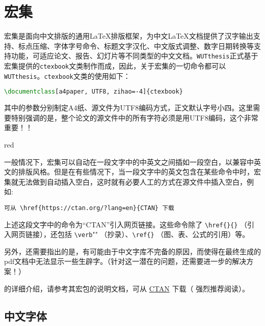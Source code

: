 \section{{\CTeX}宏集}


\par {\CTeX}宏集是面向中文排版的通用{\LaTeX}排版框架，为中文{\LaTeX}文档提供了汉字输出支持、标点压缩、字体字号命令、标题文字汉化、中文版式调整、数字日期转换等支持功能，可适应论文、报告、幻灯片等不同类型的中文文档。\texttt{WUTthesis}正式基于{\CTeX}宏集提供的\texttt{ctexbook}文类制作而成，因此，关于{\CTeX}宏集的一切命令都可以\texttt{WUTthesis}。\texttt{ctexbook}文类的使用如下：
\begin{lstlisting}[language=TeX]
\documentclass[a4paper, UTF8, zihao=-4]{ctexbook}
\end{lstlisting}
其中的参数分别制定A4纸、源文件为UTF8编码方式，正文默认字号小四。{\color{red}这里需要特别强调的是，整个论文的源文件中的所有字符必须是用UTF8编码，这个非常重要！！}


\begin{color}{red}
\par 一般情况下，{\CTeX}宏集可以自动在一段文字中的中英文之间插如一段空白，以兼容中英文的排版风格。但是在有些情况下，当一段文字中的英文包含在某些命令中时，{\CTeX}宏集就无法做到自动插入空白，这时就有必要人工的方式在源文件中插入空白，例如:
\begin{lstlisting}
可从 \href{https://ctan.org/?lang=en}{CTAN} 下载
\end{lstlisting}
上述这段文字中的命令为“CTAN”引入网页链接。这些命令除了 \verb"\href{}{}" （引入网页链接），还包括 \verb"\verb""" （抄录）、\verb"\ref{}" （图、表、公式的引用）等。
\end{color}

{\color{red}\par 另外，还需要指出的是，有可能由于中文字库不完备的原因，而使得在最终生成的pdf文档中无法显示一些生辟字。（针对这一潜在的问题，还需要进一步的解决方案！）}


\par {\CTeX}的详细介绍，请参考其宏包的说明文档，可从 \href{https://ctan.org/?lang=en}{CTAN} 下载（{\color{red} 强烈推荐阅读}）。



\subsection{中文字体}


